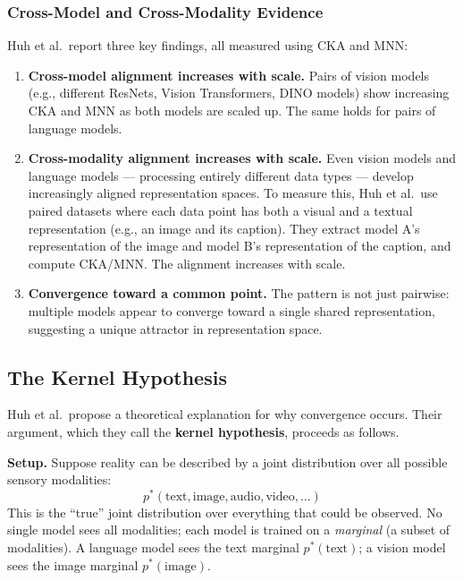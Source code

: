 \documentclass[11pt, a4paper]{article}
\begin{document}
\subsubsection{Cross-Model and Cross-Modality Evidence}

Huh et al.\ report three key findings, all measured using CKA and MNN:

\begin{enumerate}[leftmargin=2em]
  \item \textbf{Cross-model alignment increases with scale.} Pairs of
    vision models (e.g., different ResNets, Vision Transformers, DINO
    models) show increasing CKA and MNN as both models are scaled up.
    The same holds for pairs of language models.

  \item \textbf{Cross-modality alignment increases with scale.} Even
    vision models and language models --- processing entirely different
    data types --- develop increasingly aligned representation spaces.
    To measure this, Huh et al.\ use paired datasets where each data
    point has both a visual and a textual representation (e.g., an image
    and its caption). They extract model A's representation of the image
    and model B's representation of the caption, and compute CKA/MNN.
    The alignment increases with scale.

  \item \textbf{Convergence toward a common point.} The pattern is not
    just pairwise: multiple models appear to converge toward a single
    shared representation, suggesting a unique attractor in
    representation space.
\end{enumerate}


\subsection{The Kernel Hypothesis}

Huh et al.\ propose a theoretical explanation for why convergence occurs.
Their argument, which they call the \textbf{kernel hypothesis}, proceeds
as follows.

\textbf{Setup.} Suppose reality can be described by a joint distribution
over all possible sensory modalities:
\[
p^*(\text{text}, \text{image}, \text{audio}, \text{video}, \ldots)
\]
This is the ``true'' joint distribution over everything that could be
observed. No single model sees all modalities; each model is trained on a
\emph{marginal} (a subset of modalities). A language model sees the
text marginal $p^*(\text{text})$; a vision model sees the image marginal
$p^*(\text{image})$.
\end{document}
